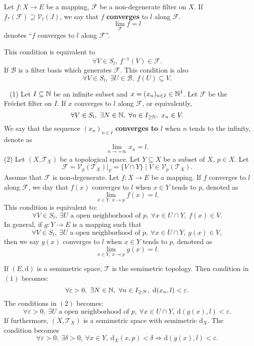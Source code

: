 \begin{definitionenv}
    Let $f:X\longrightarrow E$ be a mapping, $\mathcal{F}$ be a non-degenerate filter on $X$. If $f_*(\mathcal{F})\supseteq \mathcal{V}_l(J)$, we say that $f$ \textbf{converges} to $l$ along $\mathcal{F}$.
    $$\lim_{\mathcal{F}}f=l $$
    denotes ``$f$ converges to $l$ along $\mathcal{F}$''.

    This condition is equivalent to 
    $$\forall V\in S_l,\ f^{-1}(V)\in \mathcal{F}.$$
    If $\mathcal{B}$ is a filter basis which generates $\mathcal{F}$. This condition is also 
    $$\forall V\in S_l,\ \exists U\in \mathcal{B},\ f(U)\subseteq V.$$
    
\end{definitionenv}
\begin{exampleenv}
    \ \newline
    (1) Let $I\subseteq \mathbb{N}$ be an infinite subset and $x=(x_n)_{n\in I}\in \mathbb{N}^I$. Let $\mathcal{F}$ be the Fréchet filter on $I$. If $x$ converges to $l$ along $\mathcal{F}$, or equivalently,
    $$\forall V\in S_l,\ \exists N\in \mathbb{N},\ \forall n\in I_{\ge \mathbb{N}},\ x_n\in V.$$
    We say that the sequence $(x_n)_{n\in I}$ \textbf{converges to $l$} when $n$ tends to the infinity, denote as 
    $$\lim_{n\rightarrow+\infty}x_n=l.$$
    \newline
    (2) Let $(X,\mathscr{T}_X)$ be a topological space. Let $Y\subseteq X$ be a subset of $X$, $p\in X$. Let 
    $$\mathcal{F}=\mathcal{V}_p(\mathscr{T}_X)|_Y=\{V\cap Y\}\mid V\in \mathcal{V}_p(\mathscr{T}_X).$$
    Assume that $\mathcal{F}$ is non-degenerate. Let $f:X\longrightarrow E$ be a mapping. If $f$ converges to $l$ along $\mathcal{F}$, we day that $f(x)$ converges to $l$ when $x\in Y$ tends to $p$, denoted as 
    $$\lim_{x\in Y,\ x\rightarrow p}f(x)=l.$$
    This condition is equivalent to:
    $$\forall V\in S_l,\ \exists U \text{ a open neighborhood of }p, \ \forall x\in U\cap Y, \ f(x)\in V.$$
    In general, if $g:Y\longrightarrow E$ is a mapping such that
    $$\forall V\in S_l,\ \exists U \text{ a open neighborhood of }p, \ \forall x\in U\cap Y, \ g(x)\in V,$$
    then we say $g(x)$ converges to $l$ when $x\in Y$ tends to $p$, denoteed as 
    $$\lim_{x\in Y,\ x\rightarrow p}g(x)=l.$$
\end{exampleenv}
\begin{remark}
    If $(E,\mathrm{d})$ is a semimetric space, $\mathscr{T}$ is the semimetric topology. Then condition in $(1)$ becomes:
    $$\forall \varepsilon >0,\ \exists N\in \NN,\ \forall n\in I_{\ge N},\ \mathrm{d}(x_n,l)<\varepsilon.$$
    The conditions in $(2)$ becomes:
    $$\forall \varepsilon >0,\ \exists U \text{ a open neighborhood of }p, \ \forall x\in U\cap Y, \ \mathrm{d}(g(x),l)<\varepsilon.$$
    If furthermore, $(X,\mathscr{T}_X)$ is a semimetric space with semimetric $\mathrm{d}_X$. The condition becomes 
    $$\forall \varepsilon>0,\ \exists \delta>0,\ \forall x\in Y,\ \mathrm{d}_X(x,p)<\delta\Rightarrow \mathrm{d}(g(x),l)<\varepsilon.$$
\end{remark}
